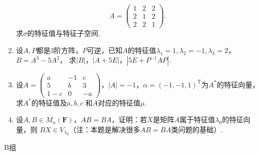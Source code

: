 \begin{enumerate}
	$$A=\begin{pmatrix}
		1 & 2 & 2 \\ 2 & 1 & 2 \\ 2 & 2 & 1
	\end{pmatrix}.$$
	求$\sigma$的特征值与特征子空间.
	\item 设$A,P$都是3阶方阵，$P$可逆，已知$A$的特征值$\lambda_1=1,\lambda_2=-1,\lambda_3=2$，$B=A^3-5A^2$，
	求$|B|$，$|A+5E|$，$|5E+P^{-1}AP|$.
	\item 设$A=\begin{pmatrix}
		a & -1 & c \\ 5 & b & 3 \\ 1-c & 0 & -a
	\end{pmatrix}$，$|A|=-1$，$\alpha=(-1,-1,1)^\mathrm{T}$为$A^*$的特征向量，求$A^*$的特征值及$a,b,c$
	和$A$对应的特征值$\mu$.
	\item 设$A,B\in M_n(\mathbf{F})$，$AB=BA$，证明：若$X$是矩阵$A$属于特征值$\lambda_0$的特征向量，则
	$BX\in V_{\lambda_0}$（注：本题是解决很多$AB=BA$类问题的基础）.
\end{enumerate}
\centerline{\heiti B组}

